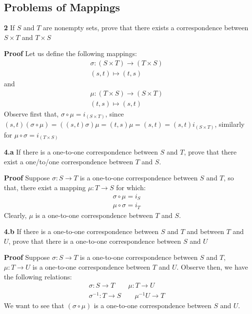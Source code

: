 \documentclass[11pt,a4paper]{article}
\begin{document}
\subsection{Problems of Mappings}
\textbf{2} If $S$ and $T$ are nonempty sets, prove that there exists a correspondence between $ S \times T$ and $ T \times S$


\textbf{Proof}
Let us define the following mappings:
\begin{align*}
\sigma: (S \times T) \rightarrow (T \times S) \\
(s,t) \longmapsto (t,s)
\end{align*}
and 
\begin{align*}
\mu: (T \times S) \rightarrow (S \times T) \\
(t,s) \longmapsto (s,t)
\end{align*}
Observe first that, $ \sigma \circ \mu  = i_{(S \times T)} $, since $ (s,t)(\sigma \circ \mu) = ((s,t)\sigma)\mu = (t,s)\mu = (s,t) = (s,t)i_{(S \times T)} $, similarly for $ \mu \circ \sigma = i_{(T \times S)} $

\textbf{4.a} If there is a one-to-one correspondence between $S$ and $T$, prove  that there exist a one/to/one correspondence between $T$ and $S$. \par
\textbf{Proof}
Suppose $\sigma: S \rightarrow T $ is a one-to-one correspondence between $S$ and $T$, so that, there exist a mapping $ \mu: T \rightarrow S$ for which:
\begin{align*}
\sigma \circ \mu = i_S \\
\mu \circ \sigma = i_T
\end{align*}
Clearly, $ \mu $ is a one-to-one correspondence between $T$ and $S$. \par

\textbf{4.b} If there is a one-to-one correspondence between $S$ and $T$ and between $T$ and $U$, prove that there is a one-to-one correspondence between $S$ and $U$ \par 
\textbf{Proof}
Suppose $ \sigma: S \rightarrow T $ is a one-to-one correspondence between $S$ and $T$, $ \mu: T \rightarrow U$ is a one-to-one correspondence between $T$ and $U$. Observe then, we have the following relations:
\begin{align*}
\sigma : S \rightarrow T \quad \quad \mu: T \rightarrow U \\
\sigma^{-1}: T \rightarrow S \quad \quad \mu^{-1} U \rightarrow T
\end{align*}
We want to see that $ (\sigma \circ \mu)  $ is a one-to-one correspondence between $S$ and $U$.
\end{document}

